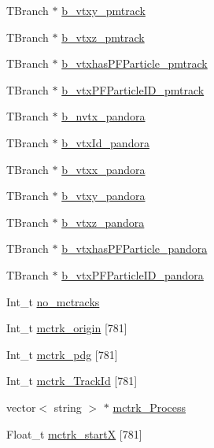 \begin{DoxyCompactItemize}
\item 
T\-Branch $\ast$ \hyperlink{classanatree_a7e42cae091e8acea09f7a1e1793fdf57}{b\-\_\-vtxy\-\_\-pmtrack}
\item 
T\-Branch $\ast$ \hyperlink{classanatree_a8cef2626f8c7a254570369450d37b68f}{b\-\_\-vtxz\-\_\-pmtrack}
\item 
T\-Branch $\ast$ \hyperlink{classanatree_a048ce68f96d69eb0a3060d3058f63823}{b\-\_\-vtxhas\-P\-F\-Particle\-\_\-pmtrack}
\item 
T\-Branch $\ast$ \hyperlink{classanatree_a555a82d3c8279ead8b0e1350ec066bab}{b\-\_\-vtx\-P\-F\-Particle\-I\-D\-\_\-pmtrack}
\item 
T\-Branch $\ast$ \hyperlink{classanatree_a954441f012e091e084b0441341e480d1}{b\-\_\-nvtx\-\_\-pandora}
\item 
T\-Branch $\ast$ \hyperlink{classanatree_a6b0671aa6e7d8a9136795e2e82b32152}{b\-\_\-vtx\-Id\-\_\-pandora}
\item 
T\-Branch $\ast$ \hyperlink{classanatree_a5d2c77ffb866e3bb8601ecb39770d529}{b\-\_\-vtxx\-\_\-pandora}
\item 
T\-Branch $\ast$ \hyperlink{classanatree_a1407580f2a3f0f6a87d9cc3c5c5521dd}{b\-\_\-vtxy\-\_\-pandora}
\item 
T\-Branch $\ast$ \hyperlink{classanatree_a599d23166be5a996121b5d1f35ef1f56}{b\-\_\-vtxz\-\_\-pandora}
\item 
T\-Branch $\ast$ \hyperlink{classanatree_a576282c18c6c07b641f46c2d35887715}{b\-\_\-vtxhas\-P\-F\-Particle\-\_\-pandora}
\item 
T\-Branch $\ast$ \hyperlink{classanatree_a2113a2c4a5e200f30e6f13b8eff8324d}{b\-\_\-vtx\-P\-F\-Particle\-I\-D\-\_\-pandora}
\item 
Int\-\_\-t \hyperlink{classanatree_aabdf13b17aaeb4aae05a427dd601955a}{no\-\_\-mctracks}
\item 
Int\-\_\-t \hyperlink{classanatree_acae3f36be2999afb0940a9cab9847dcc}{mctrk\-\_\-origin} \mbox{[}781\mbox{]}
\item 
Int\-\_\-t \hyperlink{classanatree_a4b45b29a37b7ecbebab9de9c6e738881}{mctrk\-\_\-pdg} \mbox{[}781\mbox{]}
\item 
Int\-\_\-t \hyperlink{classanatree_a8420b20e93ee1d4be6090eae17ec2ad0}{mctrk\-\_\-\-Track\-Id} \mbox{[}781\mbox{]}
\item 
vector$<$ string $>$ $\ast$ \hyperlink{classanatree_a206fa2c6aabed167deb2a695feb437b2}{mctrk\-\_\-\-Process}
\item 
Float\-\_\-t \hyperlink{classanatree_ac580667ac304cae59b47b313fb17f242}{mctrk\-\_\-start\-X} \mbox{[}781\mbox{]}

\end{DoxyCompactItemize}
